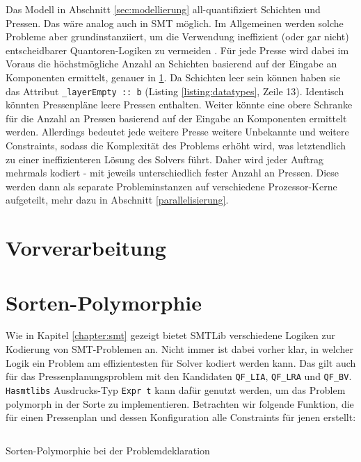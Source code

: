 Das Modell in Abschnitt \ref{sec:modellierung} all-quantifiziert Schichten und Pressen.
Das wäre analog auch in SMT möglich.
Im Allgemeinen werden solche Probleme aber grundinstanziiert,
um die Verwendung ineffizient (oder gar nicht) entscheidbarer Quantoren-Logiken zu vermeiden \cite{smtquantifiersarehard, smtquantifiersarehard2}.
Für jede Presse wird dabei im Voraus die höchstmögliche Anzahl an Schichten basierend auf der Eingabe an Komponenten ermittelt, genauer in \ref{sec:vorverarbeitung}.
Da Schichten leer sein können haben sie das Attribut \texttt{\_layerEmpty :: b} (Listing \ref{listing:datatypes}, Zeile 13).
Identisch könnten Pressenpläne leere Pressen enthalten.
Weiter könnte eine obere Schranke für die Anzahl an Pressen basierend auf der Eingabe an Komponenten ermittelt werden.
Allerdings bedeutet jede weitere Presse weitere Unbekannte und weitere Constraints, sodass die Komplexität des Problems erhöht wird,
was letztendlich zu einer ineffizienteren Lösung des Solvers führt.
Daher wird jeder Auftrag mehrmals kodiert - mit jeweils unterschiedlich fester Anzahl an Pressen.
Diese werden dann als separate Probleminstanzen auf verschiedene Prozessor-Kerne aufgeteilt, mehr dazu in Abschnitt \ref{parallelisierung}.

\section{Vorverarbeitung}
\label{sec:vorverarbeitung}

\section{Sorten-Polymorphie}
Wie in Kapitel \ref{chapter:smt} gezeigt bietet SMTLib verschiedene Logiken zur Kodierung von SMT-Problemen an.
Nicht immer ist dabei vorher klar, in welcher Logik ein Problem am effizientesten für Solver kodiert werden kann.
Das gilt auch für das Pressenplanungsproblem mit den Kandidaten \texttt{QF\_LIA}, \texttt{QF\_LRA} und \texttt{QF\_BV}.
\texttt{Hasmtlibs} Ausdrucks-Typ \texttt{Expr t} kann dafür genutzt werden, um das Problem polymorph in der Sorte zu implementieren.
Betrachten wir folgende Funktion, die für einen Pressenplan und dessen Konfiguration alle Constraints für jenen erstellt:

\begin{listing}[H]
    \inputminted[linenos=true]{haskell}{Code/Implementierung/SortPoly.hs}
    \caption{Sorten-Polymorphie bei der Problemdeklaration}
    \label{listing:implsortpoly}
\end{listing}

